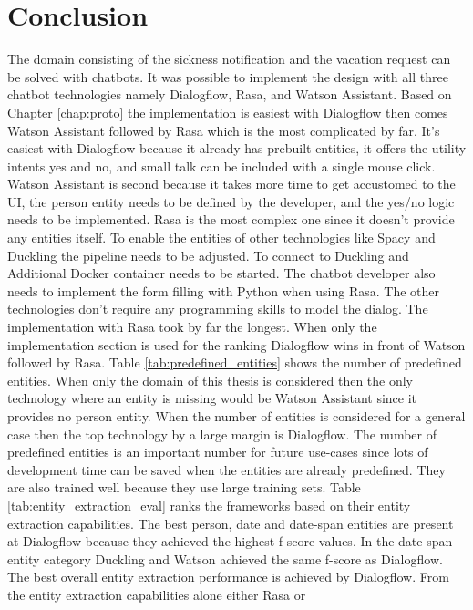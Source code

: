 \section{Conclusion}
The domain consisting of the sickness notification and the vacation request 
can be solved with chatbots.
It was possible to implement the design with all three chatbot 
technologies namely Dialogflow, Rasa, and Watson Assistant.
Based on Chapter \ref{chap:proto} the implementation is 
easiest with Dialogflow then comes Watson Assistant followed by 
Rasa which is the most complicated by far.
It's easiest with Dialogflow because it already has prebuilt entities,
it offers the utility intents yes and no, and small talk can be 
included with a single mouse click.
Watson Assistant is second because it takes more time to get accustomed 
to the UI, the person entity needs to be defined by the developer,
and the yes/no logic needs to be implemented.
Rasa is the most complex one since it doesn't provide any entities 
itself.
To enable the entities of other technologies like Spacy and Duckling the 
pipeline needs to be adjusted.
To connect to Duckling and Additional Docker container needs to be started.
The chatbot developer also needs to implement the form filling with Python 
when using Rasa. 
The other technologies don't require any programming skills to model the 
dialog.
The implementation with Rasa took by far the longest.
When only the implementation section is used for the ranking 
Dialogflow wins in front of Watson followed by Rasa.
Table \ref{tab:predefined_entities} shows the number of predefined entities.
When only the domain of this thesis is considered then the only technology 
where an entity is missing would be Watson Assistant since it provides no person entity.
When the number of entities is considered for a general case then the 
top technology by a large margin is Dialogflow.
The number of predefined entities is an important number for future use-cases since 
lots of development time can be saved when the entities are already predefined.
They are also trained well because they use large training sets.
Table \ref{tab:entity_extraction_eval} ranks the frameworks based on their 
entity extraction capabilities.
The best person, date and date-span entities are present at Dialogflow because they achieved the 
highest f-score values.
In the date-span entity category Duckling and Watson achieved the same f-score as Dialogflow.
The best overall entity extraction performance is achieved by Dialogflow. 
From the entity extraction capabilities alone either Rasa or 
